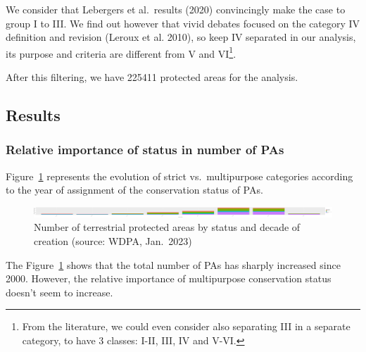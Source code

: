 \documentclass[
  letterpaper,
  DIV=11,
  numbers=noendperiod]{scrartcl}
\begin{document}
We consider that Lebergers et al.~results (2020) convincingly make the
case to group I to III. We find out however that vivid debates focused
on the category IV definition and revision (Leroux et al. 2010), so keep
IV separated in our analysis, its purpose and criteria are different
from V and VI\footnote{From the literature, we could even consider also
  separating III in a separate category, to have 3 classes: I-II, III,
  IV and V-VI.}.

After this filtering, we have 225411 protected areas for the analysis.

\hypertarget{results}{%
\subsection{Results}\label{results}}

\hypertarget{relative-importance-of-status-in-number-of-pas}{%
\subsubsection{Relative importance of status in number of
PAs}\label{relative-importance-of-status-in-number-of-pas}}

Figure~\ref{fig-n-pas} represents the evolution of strict
vs.~multipurpose categories according to the year of assignment of the
conservation status of PAs.

\begin{figure}

{\centering \includegraphics{Suppl_material_test_EoH_files/figure-pdf/fig-n-pas-1.pdf}

}

\caption{\label{fig-n-pas}Number of terrestrial protected areas by
status and decade of creation (source: WDPA, Jan.~2023)}

\end{figure}

The Figure~\ref{fig-n-pas} shows that the total number of PAs has
sharply increased since 2000. However, the relative importance of
multipurpose conservation status doesn't seem to increase.
\end{document}
